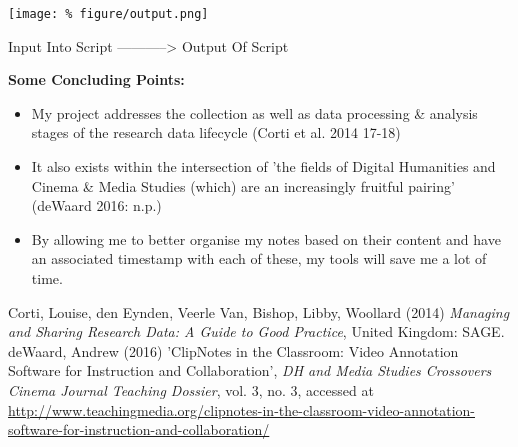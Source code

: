 \documentclass[unknownkeysallowed,usepdftitle=false, parskip=full]{beamer}
\newcommand{\secvariable}{nothing}
\newcommand{\mysection}[1]{\renewcommand{\secvariable}{#1}
}
\begin{document}
\mysection{slab}
\begin{frame}\label{\secvariable}
\begin{center}
\texttt{[image: \%
figure/output.png]}
\end{center}
    \parbox{\linewidth}{\begin{center}
Input Into Script -----------\textgreater{} Output Of Script \end{center}}
\end{frame}


\mysection{conclusion}
\begin{frame}\label{\secvariable}
\textbf{Some Concluding Points:}  
  \begin{itemize}
  \item My project addresses the collection as well as data processing \& analysis stages of the research data lifecycle (Corti et al. 2014 17-18)
  \item It also exists within the intersection of 'the fields of Digital Humanities and Cinema \& Media Studies (which) are an increasingly fruitful pairing' (deWaard 2016: n.p.)
  \item By allowing me to better organise my notes based on their content and have an associated timestamp with each of these, my tools will save me a lot of time.
  \end{itemize}
\vspace{10pt}
\tiny{
Corti, Louise, den Eynden, Veerle Van, Bishop, Libby, Woollard (2014) \textit{Managing and Sharing Research Data: A Guide to Good Practice}, United Kingdom: SAGE.\\
\vspace{5pt}
deWaard, Andrew (2016) 'ClipNotes in the Classroom: Video Annotation Software for Instruction and Collaboration', \textit{DH and Media Studies Crossovers
Cinema Journal Teaching Dossier}, vol. 3, no. 3, accessed at \url{http://www.teachingmedia.org/clipnotes-in-the-classroom-video-annotation-software-for-instruction-and-collaboration/}}
\end{frame}
\end{document}
